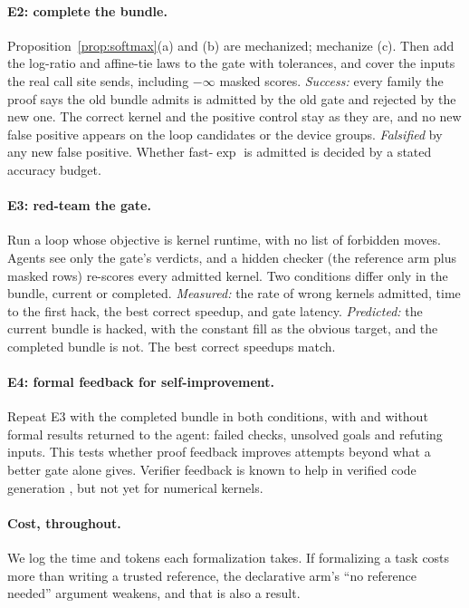 \paragraph{E2: complete the bundle.}
Proposition~\ref{prop:softmax}(a) and (b) are mechanized; mechanize (c). Then add the log-ratio and affine-tie laws to
the gate with tolerances, and cover the inputs the real call site sends, including
$-\infty$ masked scores. \emph{Success:} every family the proof says the old bundle admits
is admitted by the old gate and rejected by the new one. The correct kernel and the
positive control stay as they are, and no new false positive appears on the
\loopCandidates{} loop candidates or the \fpGroups{} device groups. \emph{Falsified} by any
new false positive. Whether fast-$\exp$ is admitted is decided by a stated accuracy
budget.

\paragraph{E3: red-team the gate.}
Run a loop whose objective is kernel runtime, with no list of forbidden moves. Agents
see only the gate's verdicts, and a hidden checker (the reference arm plus masked
rows) re-scores every admitted kernel. Two conditions differ only in the bundle, current
or completed. \emph{Measured:} the rate of wrong kernels admitted, time to the first
hack, the best correct speedup, and gate latency. \emph{Predicted:} the current bundle is
hacked, with the constant fill as the obvious target, and the completed bundle is not. The
best correct speedups match.

\paragraph{E4: formal feedback for self-improvement.}
Repeat E3 with the completed bundle in both conditions, with and without formal results
returned to the agent: failed checks, unsolved goals and refuting inputs. This tests
whether proof feedback improves attempts beyond what a better gate alone gives.
Verifier feedback is known to help in verified code generation
\citep{ye2025verina,aggarwal2025alphaverus}, but not yet for numerical kernels.

\paragraph{Cost, throughout.}
We log the time and tokens each formalization takes. If formalizing a task costs more
than writing a trusted reference, the declarative arm's ``no reference needed''
argument weakens, and that is also a result.
